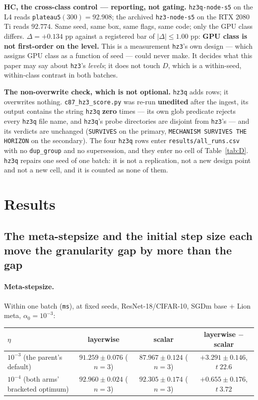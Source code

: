 \documentclass[10pt,letterpaper]{article}
\newcommand{\Dstat}{D}                         %
\newcommand{\plateau}{\texttt{plateau5}}
\newcommand{\arm}[1]{\texttt{#1}}
\begin{document}
\textbf{HC, the cross-class control --- reporting, not gating.} \arm{hz3q-node-s5} on the L4 reads
\plateau{}$(300) = 92.908$; the archived \arm{hz3-node-s5} on the RTX 2080 Ti reads $92.774$. Same
seed, same box, same flags, same code; only the GPU class differs. $\Delta = +0.134$ pp against a
registered bar of $|\Delta| \le 1.00$ pp: \textbf{GPU class is not first-order on the level.} This
is a measurement \arm{hz3}'s own design --- which assigns GPU class as a function of seed --- could
never make. It decides what this paper may say about \arm{hz3}'s \emph{levels}; it does not touch
$\Dstat$, which is a within-seed, within-class contrast in both batches.

\textbf{The non-overwrite check, which is not optional.} \arm{hz3q} adds rows; it overwrites
nothing. \texttt{c87\_hz3\_score.py} was re-run \textbf{unedited} after the ingest, its output
contains the string \texttt{hz3q} \textbf{zero} times --- its own glob predicate rejects every
\arm{hz3q} file name, and \arm{hz3q}'s probe directories are disjoint from \arm{hz3}'s --- and its
verdicts are unchanged (\texttt{SURVIVES} on the primary, \texttt{MECHANISM SURVIVES THE HORIZON}
on the secondary). The four \arm{hz3q} rows enter \texttt{results/all\_runs.csv} with no
\texttt{dup\_group} and no supersession, and they enter no cell of Table~\ref{tab:D}. \arm{hz3q}
repairs one seed of one batch: it is not a replication, not a new design point and not a new cell,
and it is counted as none of them.

\section{Results}
\label{sec:results}

\subsection{The meta-stepsize and the initial step size each move the granularity gap by more
than the gap}
\label{sec:eta-alpha}

\paragraph{Meta-stepsize.}
Within one batch (\arm{ms}), at fixed seeds, ResNet-18/CIFAR-10, SGDm base + Lion meta,
$\alpha_0 = 10^{-3}$:

\begin{center}
\small
\begin{tabular}{@{}lccc@{}}
\toprule
$\eta$ & layerwise & scalar & layerwise $-$ scalar \\
\midrule
$10^{-3}$ (the parent's default) & $91.259 \pm 0.076$ ($n{=}3$) & $87.967 \pm 0.124$ ($n{=}3$) &
  $\mathbf{+3.291 \pm 0.146}$, $t\ 22.6$ \\
$10^{-4}$ (both arms' bracketed optimum) & $92.960 \pm 0.024$ ($n{=}3$) &
  $92.305 \pm 0.174$ ($n{=}3$) & $\mathbf{+0.655 \pm 0.176}$, $t\ 3.72$ \\
\bottomrule
\end{tabular}
\end{center}
\end{document}
